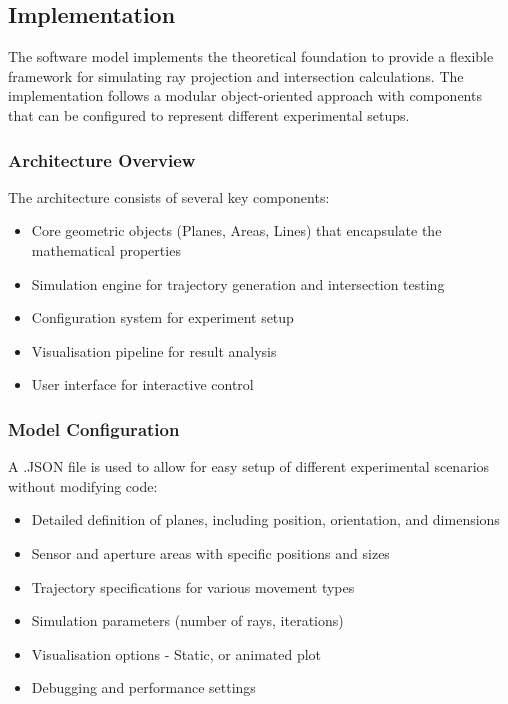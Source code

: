 \subsection{Implementation}

The software model implements the theoretical foundation to provide a flexible framework for simulating ray projection and intersection calculations. The implementation follows a modular object-oriented approach with  components that can be configured to represent different experimental setups.

\subsubsection{Architecture Overview}

The architecture consists of several key components:
\begin{itemize}
\item Core geometric objects (Planes, Areas, Lines) that encapsulate the mathematical properties
\item Simulation engine for trajectory generation and intersection testing
\item Configuration system for experiment setup
\item Visualisation  pipeline for result analysis
\item User interface for interactive control
\end{itemize}

\subsubsection{Model Configuration}

A .JSON file is used to allow for easy setup of different experimental scenarios without modifying code:

\begin{itemize}
\item Detailed definition of planes, including position, orientation, and dimensions
\item Sensor and aperture areas with specific positions and sizes
\item Trajectory specifications for various movement types
\item Simulation parameters (number of rays, iterations)
\item Visualisation options - Static, or animated plot 
\item Debugging and performance settings
\end{itemize}

